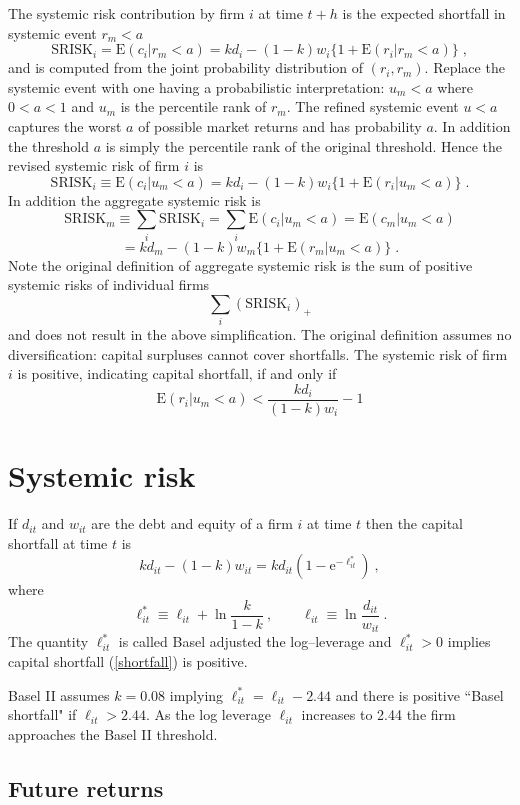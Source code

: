 \documentclass[authoryear]{elsarticle}
\newcommand{\E}{\mathrm{E}}
\newcommand{\e}{\mathrm{e}}
\newcommand{\eref}[1]{(\ref{#1})}
\newcommand{\cq}{\ , \qquad}
\newcommand{\be}[1]{\begin{equation}\label{#1}}
\newcommand{\ee}{\end{equation}}
\begin{document}
The systemic risk contribution by firm $i$ at time $t+h$ is the expected shortfall in systemic event $r_m<a$
$$
\mathrm{SRISK}_i = \E(c_i|r_m<a) = kd_i -(1-k)w_i\{1+\E(r_i|r_m<a)\} \;,
$$
and is computed from the joint probability distribution of $(r_i,r_m)$. Replace the systemic event with one having a probabilistic interpretation: $u_m < a$ where $0<a<1$ and $u_m$ is the percentile rank of $r_m$. The refined systemic event $u < a$ captures the worst $a$ of possible market returns and has probability $a$. In addition the threshold $a$ is simply the percentile rank of the original threshold. Hence the revised systemic risk of firm $i$ is
$$
\mathrm{SRISK}_i \equiv \E(c_i|u_m<a) = kd_i -(1-k)w_i\{1+\E(r_i|u_m<a)\} \;.
$$
In addition the aggregate systemic risk is
$$
\mathrm{SRISK}_m \equiv \sum_i \mathrm{SRISK}_i = \sum_i \E(c_i|u_m<a) = \E(c_m|u_m<a)
$$
$$
=kd_m -(1-k)w_m\{1+\E(r_m|u_m<a)\} \;.
$$
Note the original definition of aggregate systemic risk is the sum of positive systemic risks of individual firms
$$
\sum_i \left(\mathrm{SRISK}_i\right)_+
$$
and does not result in the above simplification. The original definition assumes no diversification: capital surpluses cannot cover shortfalls. The systemic risk of firm $i$ is positive, indicating capital shortfall, if and only if
$$
\E(r_i|u_m<a) < \frac{kd_i}{(1-k)w_i} - 1
$$







\section{Systemic risk}

If $d_{it}$ and $w_{it}$ are the debt and equity of a firm $i$ at time $t$ then the capital shortfall at time $t$ is 
\be{shortfall}
kd_{it}  - (1-k) w_{it} = kd_{it}\left(1-\e^{-\ell^*_{it}}\right)\ ,
\ee
where 
$$
\ell^*_{it} \equiv \ell_{it} + \ln \frac{k}{1-k}\cq \ell_{it} \equiv \ln\frac{d_{it}}{w_{it}}\ .
$$
The quantity $\ell^*_{it}$ is called Basel adjusted the log--leverage and $\ell^*_{it}>0$ implies capital shortfall \eref{shortfall} is positive. 


Basel II assumes $k=0.08$ implying $\ell_{it}^*=\ell_{it}-2.44$  and there is  positive  ``Basel shortfall"  if
$\ell_{it} > 2.44$.
As the log leverage $\ell_{it}$  increases to 2.44 the firm approaches the Basel II threshold. 

\subsection{Future returns}
\end{document}
